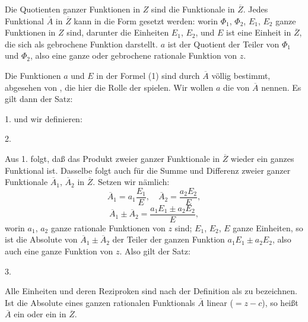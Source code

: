 
Die Quotienten ganzer Funktionen in $Z$ sind die Funktionale in $\overline{Z}$. Jedes Funktional $\overline{A}$ in $\overline{Z}$ kann in die Form gesetzt werden:
worin $\Phi_1$, $\Phi_2$, $E_1$, $E_2$ ganze Funktionen in $Z$ sind, darunter die Einheiten $E_1$, $E_2$, und $E$ ist eine Einheit in $\overline{Z}$, die sich als gebrochene Funktion darstellt. $a$ ist der Quotient der Teiler von $\Phi_1$ und $\Phi_2$, also eine ganze oder gebrochene rationale Funktion von $z$.

Die Funktionen $a$ und $E$ in der Formel (1) sind durch $\overline{A}$ völlig bestimmt, abgesehen von , die hier die Rolle der  spielen. Wir wollen $a$ die \glqq {}\grqq{} von $\overline{A}$ nennen. Es gilt dann der Satz:

1. 
und wir definieren:

2. 

Aus 1. folgt, daß das Produkt zweier ganzer Funktionale in $\overline{Z}$ wieder ein ganzes Funktional ist. Dasselbe folgt auch für die Summe und Differenz zweier ganzer Funktionale $\overline{A}_1$, $\overline{A}_2$ in $\overline{Z}$. Setzen wir nämlich:
\[
\overline{A}_1 = a_1\frac{E_1}{E}, \quad \overline{A}_2 = \frac{a_2E_2}{E},
\]
\[
\overline{A}_1 \pm \overline{A}_2 = \frac{a_1E_1 \pm a_2E_2}{E},
\]
worin $a_1$, $a_2$ ganze rationale Funktionen von $z$ sind; $E_1$, $E_2$, $E$ ganze Einheiten, so ist die Absolute von $\overline{A}_1 \pm \overline{A}_2$ der Teiler der ganzen Funktion $a_1E_1 \pm a_2E_2$, also auch eine ganze Funktion von $z$. Also gilt der Satz:

3. 

Alle Einheiten und deren Reziproken sind nach der Definition als  zu bezeichnen. Ist die Absolute eines ganzen rationalen Funktionals $\overline{A}$ linear ($= z - c$), so heißt $\overline{A}$ ein  oder ein  in $\overline{Z}$.
